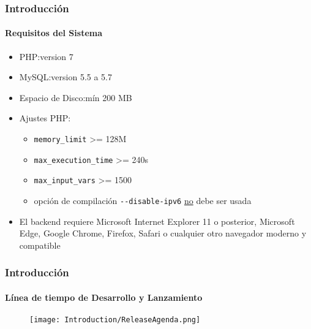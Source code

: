 \begin{frame}[fragile]
	\frametitle{Introducción}
	\framesubtitle{Requisitos del Sistema}

	\begin{itemize}
		\item PHP:\tabto{2.2cm}version 7
		\item MySQL:\tabto{2.2cm}version 5.5 a 5.7
		\item Espacio de Disco:\tabto{2.2cm}mín 200 MB
		\item Ajustes PHP:

			\begin{itemize}
				\item \texttt{memory\_limit} >= 128M
				\item \texttt{max\_execution\_time} >= 240s
				\item \texttt{max\_input\_vars} >= 1500
				\item opción de compilación \texttt{-}\texttt{-disable-ipv6} \underline{no} debe ser usada
			\end{itemize}

		\item El backend requiere Microsoft Internet Explorer 11 o posterior,
			Microsoft Edge, Google Chrome, Firefox, Safari o cualquier otro navegador
			moderno y compatible

	\end{itemize}

\end{frame}

\begin{frame}[fragile]
	\frametitle{Introducción}
	\framesubtitle{Línea de tiempo de Desarrollo y Lanzamiento}

	\begin{figure}
		\texttt{[image: Introduction/ReleaseAgenda.png]}
	\end{figure}

\end{frame}

